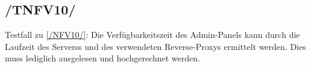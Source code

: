 \subsection*{/TNFV10/}

\label{/TNFV10/} Testfall zu \ref{/NFV10/}: Die Verfügbarkeitszeit des \Gls{Admin-Panel}s kann durch die Laufzeit des \Glspl{Server}s und des verwendeten \Gls{Reverse-Proxy}s ermittelt werden.
Dies muss lediglich ausgelesen und hochgerechnet werden.